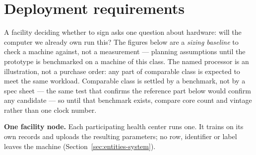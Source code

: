 \section{Deployment requirements}
\label{sec:deployment}

A facility deciding whether to sign asks one question about hardware: will the computer we already own
run this? The figures below are a \emph{sizing baseline} to check a machine against, not a measurement
--- planning assumptions until the prototype is benchmarked on a machine of this class. The named
processor is an illustration, not a purchase order: any part of comparable class is expected to meet
the same workload. Comparable class is settled by a benchmark, not by a spec sheet — the same test
that confirms the reference part below would confirm any candidate — so until that benchmark exists,
compare core count and vintage rather than one clock number.

\noindent\textbf{One facility node.} Each participating health center runs one. It trains on its own
records and uploads the resulting parameters; no row, identifier or label leaves the machine
(Section~\ref{sec:entities-system}).

